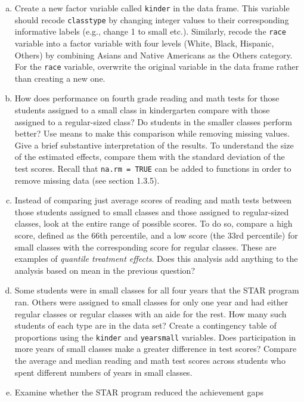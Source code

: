 \documentclass[11pt]{article}
\begin{document}
\begin{enumerate}[a.]
\item Create a new factor variable called {\tt kinder} in the data
  frame.  This variable should recode {\tt classtype} by changing
  integer values to their corresponding informative labels (e.g.,
  change 1 to small etc.).  Similarly, recode the
  {\tt race} variable into a factor variable with four levels
  (White, Black, Hispanic, Others) by
  combining Asians and Native Americans as the Others
  category.  For the {\tt race} variable, overwrite the original
  variable in the data frame rather than creating a new one.  
  \item How does performance on fourth grade reading and math tests for
  those students assigned to a small class in kindergarten compare
  with those assigned to a regular-sized class?  Do students in the
  smaller classes perform better?  Use means to make this comparison
  while removing missing values.  Give a brief substantive
  interpretation of the results.  To understand the size of the
  estimated effects, compare them with the standard deviation of the
  test scores.  Recall
  that {\tt na.rm = TRUE} can be added to functions in order to
  remove missing data (see section 1.3.5).
\item Instead of comparing just average scores of reading and math
  tests between those students assigned to small classes and those
  assigned to regular-sized classes, look at the entire range of
  possible scores.  To do so, compare a high score, defined as the
  66th percentile, and a low score (the 33rd percentile) for small
  classes with the corresponding score for regular classes.  These are
  examples of \textit{quantile treatment effects}.  Does this analysis
  add anything to the analysis based on mean in the previous question?
  \item Some students were in small classes for all four years that the
  STAR program ran. Others were assigned to small classes for only one
  year and had either regular classes or regular classes with an aide
  for the rest. How many such students of each type are in the data
  set?  Create a contingency table of proportions using the
  {\tt kinder} and {\tt yearsmall} variables.  Does participation
  in more years of small classes make a greater difference in test
  scores?  Compare the average and median reading and math test scores
  across students who spent different numbers of years in small
  classes.
  \item Examine whether the STAR program reduced the achievement gaps

\end{enumerate}
\end{document}
